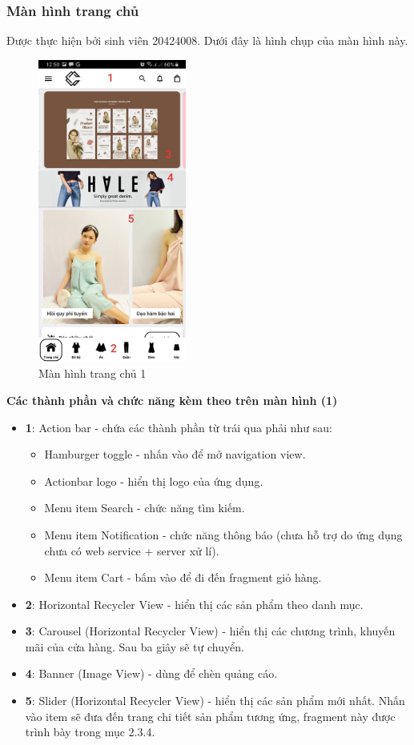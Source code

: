 \documentclass[12pt]{article}
\begin{document}
\subsubsection{Màn hình trang chủ}
Được thực hiện bởi sinh viên 20424008. Dưới đây là hình chụp của màn hình này.\\

\begin{figure}[H]
    \centering
    \includegraphics[height=10cm]{images/11.png}
    \caption{Màn hình trang chủ 1}
\end{figure}

\newpage
\indent \textbf{Các thành phần và chức năng kèm theo trên màn hình (1)}
\begin{itemize}
    \item \textbf{1}: Action bar - chứa các thành phần từ trái qua phải như sau:
    \begin{itemize}
        \item Hamburger toggle - nhấn vào để mở navigation view.
        \item Actionbar logo - hiển thị logo của ứng dụng.
        \item Menu item Search - chức năng tìm kiếm.
        \item Menu item Notification - chức năng thông báo (chưa hỗ trợ do ứng dụng chưa có web service + server xử lí).
        \item Menu item Cart - bấm vào để đi đến fragment giỏ hàng.
    \end{itemize}

    \item \textbf{2}: Horizontal Recycler View - hiển thị các sản phẩm theo danh mục.
    \item \textbf{3}: Carousel (Horizontal Recycler View) - hiển thị các chương trình, khuyến mãi của cửa hàng. Sau ba giây sẽ tự chuyển.
    \item \textbf{4}: Banner (Image View) - dùng để chèn quảng cáo.
    \item \textbf{5}: Slider (Horizontal Recycler View) - hiển thị các sản phẩm mới nhất. Nhấn vào item sẽ đưa đến trang chi tiết sản phẩm tương ứng, fragment này được trình bày trong mục 2.3.4.
\end{itemize}
\end{document}

